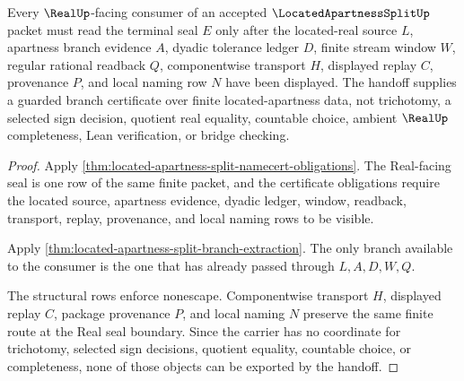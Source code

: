 \begin{theorem}
\label{thm:located-apartness-split-real-handoff}
Every $\RealUp$-facing consumer of an accepted $\LocatedApartnessSplitUp$ packet must read the terminal seal $E$ only after the located-real source $L$, apartness branch evidence $A$, dyadic tolerance ledger $D$, finite stream window $W$, regular rational readback $Q$, componentwise transport $H$, displayed replay $C$, provenance $P$, and local naming row $N$ have been displayed. The handoff supplies a guarded branch certificate over finite located-apartness data, not trichotomy, a selected sign decision, quotient real equality, countable choice, ambient $\RealUp$ completeness, Lean verification, or bridge checking.
\end{theorem}
\begin{proof}
Apply \autoref{thm:located-apartness-split-namecert-obligations}. The Real-facing seal is one row of the same finite packet, and the certificate obligations require the located source, apartness evidence, dyadic ledger, window, readback, transport, replay, provenance, and local naming rows to be visible.

Apply \autoref{thm:located-apartness-split-branch-extraction}. The only branch available to the consumer is the one that has already passed through $L,A,D,W,Q$.

The structural rows enforce nonescape. Componentwise transport $H$, displayed replay $C$, package provenance $P$, and local naming $N$ preserve the same finite route at the Real seal boundary. Since the carrier has no coordinate for trichotomy, selected sign decisions, quotient equality, countable choice, or completeness, none of those objects can be exported by the handoff.
\end{proof}



